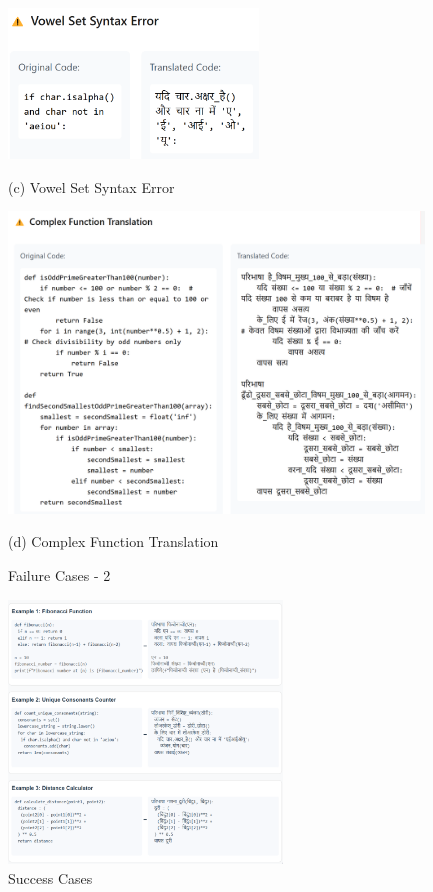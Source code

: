 \documentclass[11pt,a4paper]{article}
\begin{document}
\begin{figure}[!t]
\begin{minipage}{0.95\columnwidth}
    \includegraphics[width=0.7\linewidth,height=4cm,keepaspectratio]{Images/vowel_set_syntax_error.png}
    \vspace{-0.2cm}
    \caption*{(c) Vowel Set Syntax Error}
    \label{fig:vowel-set-syntax-error}
\end{minipage}
\vspace{0.2cm}

\begin{minipage}{0.95\columnwidth}
    \includegraphics[width=1.1\linewidth,height=8cm,keepaspectratio]{Images/complex-function-translation.png}
    \vspace{-0.2cm}
    \caption*{(d) Complex Function Translation}
    \label{fig:complex-function-translation}
\end{minipage}
\vspace{-0.2cm}
\caption{Failure Cases - 2}
\label{fig:failure-cases-2}
\end{figure}
\begin{figure}
    \centering
    \includegraphics[width=1.0\linewidth,height=7cm,keepaspectratio]{Images/success-cases.png}
    \caption{Success Cases}
    \label{fig:success-cases}
\end{figure}
\end{document}
